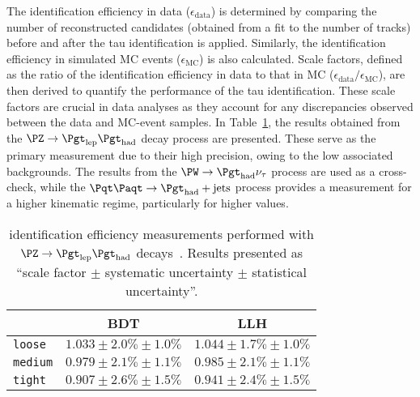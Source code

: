 The identification efficiency in data ($\epsilon_{\text{data}}$) is determined by comparing the
number of reconstructed \tauhad candidates (obtained from a fit to the number of tracks) before 
and after the tau identification is applied.  Similarly, the identification efficiency in simulated MC
events ($\epsilon_{\text{MC}}$) is also calculated. Scale factors, defined as the ratio of the 
identification efficiency in data to that in MC ($\epsilon_{\text{data}}/\epsilon_{\text{MC}}$), are 
then derived to quantify the performance of the tau identification. These scale factors are crucial 
in data analyses as they account for any discrepancies observed between the data and MC-event 
samples. In Table~\ref{tab:Chap3:Reco:Tau:eff}, the results obtained from the 
$\PZ \rightarrow \taulep \tauhad$ decay process are presented. These serve as the primary
 measurement due to their high precision, owing to the low associated backgrounds.
The results from the $\PW \rightarrow \tauhad \nu_{\tau}$ process are used as a cross-check, 
while the $\ttbar \rightarrow \tauhad + \text{jets}$ process provides a measurement for a higher
 kinematic regime, particularly for higher \pT values.

\begin{table}[h]
\centering
\begin{tabular}{l|c|c}
\toprule
       		& BDT                       				& LLH                 \\ \midrule
\texttt{loose}  	& $1.033 \pm 2.0\% \pm 1.0\%$ 	& $1.044 \pm 1.7\% \pm 1.0\%$ \\
\texttt{medium} 	& $0.979 \pm 2.1\% \pm 1.1\%$    	& $0.985 \pm 2.1\% \pm 1.1\%$ \\
\texttt{tight}  	& $0.907 \pm 2.6\% \pm 1.5\%$    	& $0.941 \pm 2.4\% \pm 1.5\%$ \\ \bottomrule
\end{tabular}
\caption{\tauhad identification efficiency measurements performed with $\PZ \rightarrow \taulep \tauhad$ decays~\cite{Leister:1609659}. 
Results presented as ``scale factor $\pm$ systematic uncertainty $\pm$ statistical uncertainty''.}
\label{tab:Chap3:Reco:Tau:eff}
\end{table}




